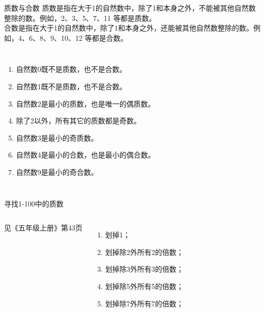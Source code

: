 \documentclass[aspectratio=169]{ctexbeamer} %
\date{\today}
\begin{document}
\begin{frame}[t]{质数与合数}
\alert{质数}是指在\alert{大于1的自然数}中，除了\alert{1和本身}之外，\alert{不能}被其他自然数整除的数。例如，2、3、5、7、11 等都是质数。\\
\alert{合数}是指在\alert{大于1的自然数}中，除了\alert{1和本身}之外，\alert{还能}被其他自然数整除的数。例如，4、6、8、9、10、12 等都是合数。
\begin{columns}
\begin{enumerate}[label={\arabic*.}]
\item 自然数0既\alert{不是质数}，也\alert{不是合数}。 
\item 自然数1既\alert{不是质数}，也\alert{不是合数}。 
\item 自然数2是最小的\alert{质数}，也是唯一的\alert{偶质数}。 
\item \alert{除了2以外}，所有其它的质数都是\alert{奇数}。 
\item 自然数3是最小的\alert{奇质数}。 
\item 自然数4是最小的\alert{合数}，也是最小的\alert{偶合数}。 
\item 自然数9是最小的\alert{奇合数}。
\end{enumerate}
\end{columns}
\end{frame}

\begin{frame}[t]{寻找1-100中的质数}
\begin{columns}
见《五年级上册》第43页
\begin{enumerate}[label={\arabic*.}]
\item 划掉1；
\item 划掉除2外所有2的倍数；
\item 划掉除3外所有3的倍数；
\item 划掉除5外所有5的倍数；
\item 划掉除7外所有7的倍数；
\end{enumerate}
\end{columns}


\end{frame}
\end{document}
